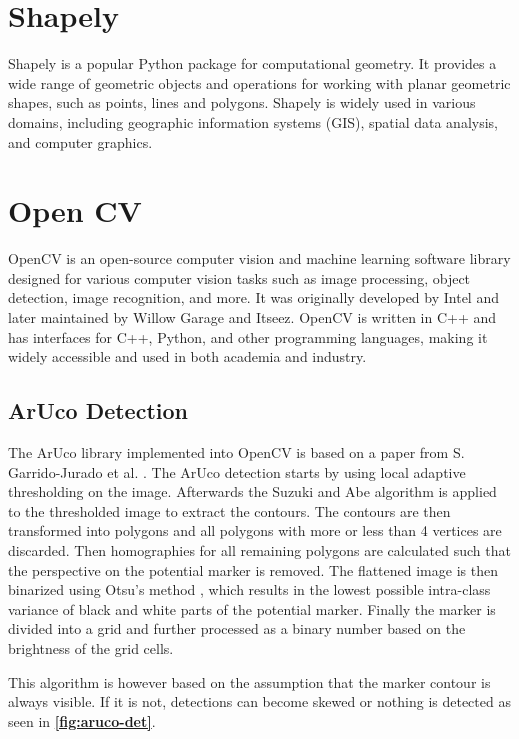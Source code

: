 \documentclass[10pt]{book}
\newcommand{\figureref}[1]{\textbf{\autoref{#1}}}
\begin{document}
\section{Shapely} %

Shapely is a popular Python package for computational geometry. It provides a wide range of geometric objects and operations for working with planar geometric shapes, such as points, lines and polygons. Shapely is widely used in various domains, including geographic information systems (GIS), spatial data analysis, and computer graphics.

\section{Open CV}

\ac{OpenCV} is an open-source computer vision and machine learning software library designed for various computer vision tasks such as image processing, object detection, image recognition, and more. It was originally developed by Intel and later maintained by Willow Garage and Itseez. \ac{OpenCV} is written in C++ and has interfaces for C++, Python, and other programming languages, making it widely accessible and used in both academia and industry.

\subsection{ArUco Detection}
\label{sec:aruco_det}

The \ac{ArUco} library implemented into \ac{OpenCV} is based on a paper from S. Garrido-Jurado et al. \cite{garrido2014automatic}. The \ac{ArUco} detection starts by using local adaptive thresholding on the image. Afterwards the Suzuki
and Abe algorithm \cite{SUZUKI198532} is applied to the thresholded image to extract the contours. The contours are then transformed into polygons \cite{douglas1973algorithms} and all polygons with more or less than 4 vertices are discarded. Then homographies for all remaining polygons are calculated such that the perspective on the potential marker is removed. The flattened image is then binarized using Otsu's method \cite{4310076}, which results in the lowest possible intra-class variance of black and white parts of the potential marker. Finally the marker is divided into a grid and further processed as a binary number based on the brightness of the grid cells.

This algorithm is however based on the assumption that the marker contour is always visible. If it is not, detections can become skewed or nothing is detected as seen in \figureref{fig:aruco-det}.
\end{document}
